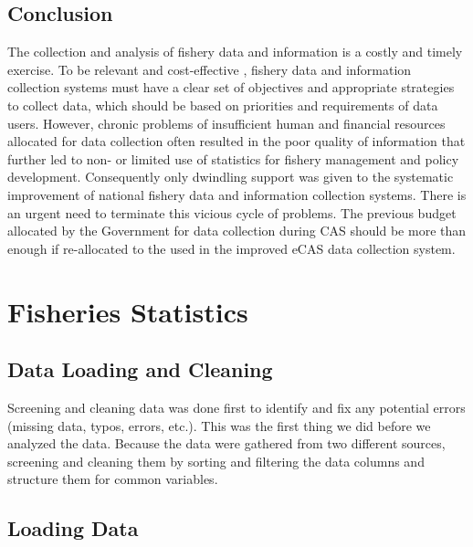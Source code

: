 \documentclass[
  12pt,
  a4paper,
  oneside]{book}
\begin{document}
\hypertarget{conclusion}{%
\section*{Conclusion}\label{conclusion}}

The collection and analysis of fishery data and information is a costly and timely exercise. To be relevant and cost-effective , fishery data and information collection systems must have a clear set of objectives and appropriate strategies to collect data, which should be based on priorities and requirements of data users. However, chronic problems of insufficient human and financial resources allocated for data collection often resulted in the poor quality of information that further led to non- or limited use of statistics for fishery management and policy development. Consequently only dwindling support was given to the systematic improvement of national fishery data and information collection systems. There is an urgent need to terminate this vicious cycle of problems. The previous budget allocated by the Government for data collection during CAS should be more than enough if re-allocated to the used in the improved eCAS data collection system.

\cleardoublepage

\appendix

\hypertarget{appendixA}{%
\chapter{Fisheries Statistics}\label{appendixA}}

\hypertarget{data-loading-and-cleaning}{%
\section{Data Loading and Cleaning}\label{data-loading-and-cleaning}}

Screening and cleaning data was done first to identify and fix any potential errors (missing data, typos, errors, etc.). This was the first thing we did before we analyzed the data. Because the data were gathered from two different sources, screening and cleaning them by sorting and filtering the data columns and structure them for common variables.

\hypertarget{loading-data}{%
\section{Loading Data}\label{loading-data}}
\end{document}
